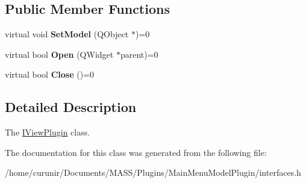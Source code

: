 \subsection*{Public Member Functions}
\begin{DoxyCompactItemize}
\item 
virtual void {\bfseries Set\+Model} (Q\+Object $\ast$)=0\hypertarget{class_i_view_plugin_a119545ceff6d7c5deaf9f1dd817af171}{}\label{class_i_view_plugin_a119545ceff6d7c5deaf9f1dd817af171}

\item 
virtual bool {\bfseries Open} (Q\+Widget $\ast$parent)=0\hypertarget{class_i_view_plugin_a2eb2d20d1d438fee58cd5a6405efdef2}{}\label{class_i_view_plugin_a2eb2d20d1d438fee58cd5a6405efdef2}

\item 
virtual bool {\bfseries Close} ()=0\hypertarget{class_i_view_plugin_a167e8ed723d3164652351d03e6db6869}{}\label{class_i_view_plugin_a167e8ed723d3164652351d03e6db6869}

\end{DoxyCompactItemize}


\subsection{Detailed Description}
The \hyperlink{class_i_view_plugin}{I\+View\+Plugin} class. 

The documentation for this class was generated from the following file\+:\begin{DoxyCompactItemize}
\item 
/home/curunir/\+Documents/\+M\+A\+S\+S/\+Plugins/\+Main\+Menu\+Model\+Plugin/interfaces.\+h\end{DoxyCompactItemize}
